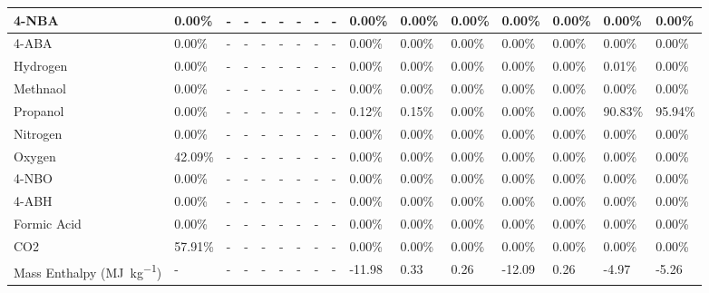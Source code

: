 \begin{landscape}
\begin{table}[H]
\begin{tabular}{|l|l|l|l|l|l|l|l|l|l|l|l|l|l|l|l|}
4-NBA                   & 0.00\%  & -    & -    & -    & -    & -    & -    & -    & 0.00\%  & 0.00\%  & 0.00\%  & 0.00\%  & 0.00\%  & 0.00\%  & 0.00\%  \\ \hline
4-ABA                   & 0.00\%  & -    & -    & -    & -    & -    & -    & -    & 0.00\%  & 0.00\%  & 0.00\%  & 0.00\%  & 0.00\%  & 0.00\%  & 0.00\%  \\ \hline
Hydrogen                & 0.00\%  & -    & -    & -    & -    & -    & -    & -    & 0.00\%  & 0.00\%  & 0.00\%  & 0.00\%  & 0.00\%  & 0.01\%  & 0.00\%  \\ \hline
Methnaol                & 0.00\%  & -    & -    & -    & -    & -    & -    & -    & 0.00\%  & 0.00\%  & 0.00\%  & 0.00\%  & 0.00\%  & 0.00\%  & 0.00\%  \\ \hline
Propanol                & 0.00\%  & -    & -    & -    & -    & -    & -    & -    & 0.12\%  & 0.15\%  & 0.00\%  & 0.00\%  & 0.00\%  & 90.83\% & 95.94\% \\ \hline
Nitrogen                & 0.00\%  & -    & -    & -    & -    & -    & -    & -    & 0.00\%  & 0.00\%  & 0.00\%  & 0.00\%  & 0.00\%  & 0.00\%  & 0.00\%  \\ \hline
Oxygen                  & 42.09\% & -    & -    & -    & -    & -    & -    & -    & 0.00\%  & 0.00\%  & 0.00\%  & 0.00\%  & 0.00\%  & 0.00\%  & 0.00\%  \\ \hline
4-NBO                   & 0.00\%  & -    & -    & -    & -    & -    & -    & -    & 0.00\%  & 0.00\%  & 0.00\%  & 0.00\%  & 0.00\%  & 0.00\%  & 0.00\%  \\ \hline
4-ABH                   & 0.00\%  & -    & -    & -    & -    & -    & -    & -    & 0.00\%  & 0.00\%  & 0.00\%  & 0.00\%  & 0.00\%  & 0.00\%  & 0.00\%  \\ \hline
Formic Acid             & 0.00\%  & -    & -    & -    & -    & -    & -    & -    & 0.00\%  & 0.00\%  & 0.00\%  & 0.00\%  & 0.00\%  & 0.00\%  & 0.00\%  \\ \hline
CO2                     & 57.91\% & -    & -    & -    & -    & -    & -    & -    & 0.00\%  & 0.00\%  & 0.00\%  & 0.00\%  & 0.00\%  & 0.00\%  & 0.00\%  \\ \hline
Mass Enthalpy (\si{\mega\J\per\kg})    & -       & -    & -    & -    & -    & -    & -    & -    & -11.98  & 0.33    & 0.26    & -12.09  & 0.26    & -4.97   & -5.26   \\ \hline
\end{tabular}
\end{table}






\end{landscape}

